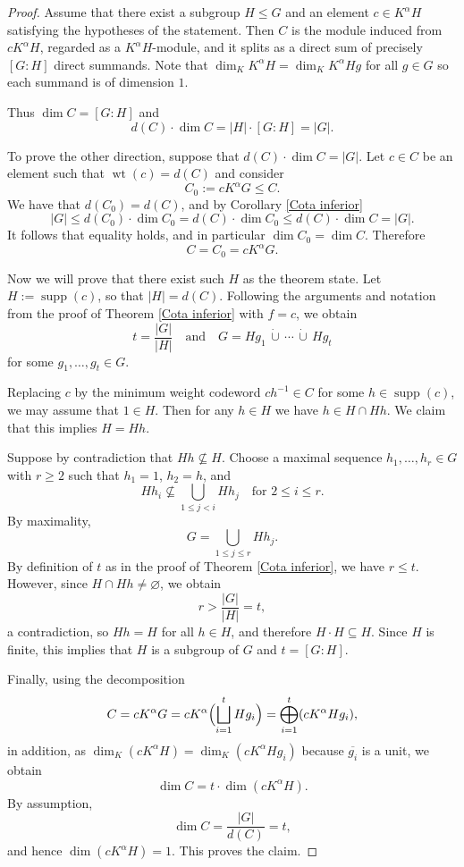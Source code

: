 \documentclass{article}
\DeclareMathOperator{\supp}{supp}
\DeclareMathOperator{\wt}{wt}
\begin{document}
\begin{proof}
Assume that there exist a subgroup $H \leq G$ and an element $c \in K^{\alpha}H$ satisfying the hypotheses of the statement. Then $C$ is the module induced from $cK^{\alpha}H$, regarded as a $K^{\alpha}H$-module, and it splits as a direct sum of precisely $[G : H]$ direct summands. Note that $\dim_K K^\alpha H = \dim_K K^\alpha Hg$ for all $g\in G$ so each summand is of dimension $1$.

Thus $\dim C = [G:H]$ and
\[
d(C)\cdot \dim C = |H|\cdot [G:H] = |G|.
\]

To prove the other direction, suppose that $d(C)\cdot \dim C = |G|$.
Let $c \in C$ be an element such that $\wt(c) = d(C)$ and consider
\[
C_0 := c K^\alpha G \le C.
\]
We have that $d(C_0) = d(C)$, and by Corollary \ref{Cota inferior}
\[
|G| \le d(C_0)\cdot \dim C_0
= d(C)\cdot \dim C_0
\le d(C)\cdot \dim C
= |G|.
\]
It follows that equality holds, and in particular $\dim C_0 = \dim C$. Therefore
\[
C = C_0 = c K^{\alpha}G.
\]

Now we will prove that there exist such $H$ as the theorem state. 
Let $H := \supp(c)$, so that $|H| = d(C)$.
Following the arguments and notation from the proof of Theorem \ref{Cota inferior}
with $f = c$, we obtain
\[
t = \frac{|G|}{|H|}
\quad\text{and}\quad
G = H g_1 \,\dot{\cup}\, \cdots \,\dot{\cup}\, H g_t
\]
for some $g_1,\dots,g_t \in G$.

Replacing $c$ by the minimum weight codeword $c h^{-1} \in C$ for some
$h \in \supp(c)$, we may assume that $1 \in H$.
Then for any $h \in H$ we have $h \in H \cap H h$.
We claim that this implies $H = H h$.

Suppose by contradiction that $H h \nsubseteq H$.
Choose a maximal sequence $h_1,\dots,h_r \in G$ with $r \ge 2$ such that
$h_1 = 1$, $h_2 = h$, and
\[
H h_i \nsubseteq \bigcup_{1 \le j < i} H h_j
\quad\text{for } 2 \le i \le r.
\]
By maximality,
\[
G = \bigcup_{1 \le j \le r} H h_j.
\]
By definition of $t$ as in the proof of Theorem \ref{Cota inferior}, we have $r \leq t $.
However, since $H \cap H h \neq \varnothing$, we obtain
\[
r > \frac{|G|}{|H|} = t,
\]
a contradiction, so $H h = H$ for all $h \in H$, and therefore $H \cdot H \subseteq H$.
Since $H$ is finite, this implies that $H$ is a subgroup of $G$ and
$t = [G:H]$.

Finally, using the decomposition
\[
C = c K^\alpha G
= c K^\alpha \Bigl( \bigsqcup_{i=1}^t H g_i \Bigr)
= \bigoplus_{i=1}^t (c K^\alpha Hg_i) ,
\]
in addition, as $\dim_K(cK^\alpha H )=\dim_K(cK^\alpha H g_i )$ because $\overline{g_i}$ is a unit, we obtain
\[
\dim C = t \cdot \dim(c K^\alpha H).
\]
By assumption,
\[
\dim C = \frac{|G|}{d(C)} = t,
\]
and hence $\dim(c K^\alpha H) = 1$.
This proves the claim.
\end{proof}
\end{document}
